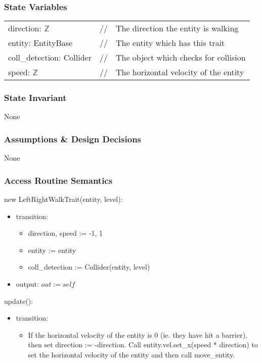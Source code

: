 \documentclass[12pt]{article}
\begin{document}
\subsubsection* {State Variables}
\begin{tabular}{lll}
    direction: $\mathbb{Z}$ & // & The direction the entity is walking\\
    entity: EntityBase & // & The entity which has this trait\\
    coll_detection: Collider & // & The object which checks for collision\\
    speed: $\mathbb{Z}$ & // & The horizontal velocity of the entity\\
\end{tabular}

\subsubsection* {State Invariant}

None

\subsubsection* {Assumptions \& Design Decisions}

None

\subsubsection* {Access Routine Semantics}

new LeftRightWalkTrait(entity, level):
\begin{itemize}
    \item transition: 
    \begin{itemize}[]
        \item direction, speed := -1, 1
        \item entity := entity
        \item coll\_detection := Collider(entity, level)
    \end{itemize}
    \item output: $out := self$
\end{itemize}

update():
\begin{itemize}
    \item transition: 
    \begin{itemize}[]
        \item If the horizontal velocity of the entity is 0 (ie. they have hit a barrier), then set direction := -direction. Call entity.vel.set\_x(speed * direction) to set the horizontal velocity of the entity and then call move\_entity.
    \end{itemize}
\end{itemize}
\end{document}
